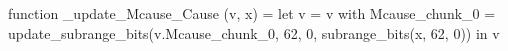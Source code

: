 function _update_Mcause_Cause (v, x) = let v = { v with Mcause_chunk_0 = update_subrange_bits(v.Mcause_chunk_0, 62, 0, subrange_bits(x, 62, 0)) } in
  v
